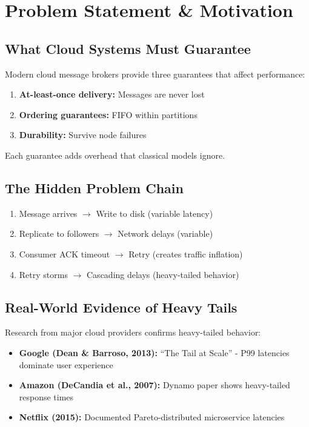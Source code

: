 \documentclass[11pt,a4paper]{article}
\begin{document}
\section{Problem Statement \& Motivation}

\subsection{What Cloud Systems Must Guarantee}

Modern cloud message brokers provide three guarantees that affect performance:

\begin{enumerate}
    \item \textbf{At-least-once delivery:} Messages are never lost
    \item \textbf{Ordering guarantees:} FIFO within partitions
    \item \textbf{Durability:} Survive node failures
\end{enumerate}

Each guarantee adds overhead that classical models ignore.

\subsection{The Hidden Problem Chain}

\begin{enumerate}
    \item Message arrives $\rightarrow$ Write to disk (variable latency)
    \item Replicate to followers $\rightarrow$ Network delays (variable)
    \item Consumer ACK timeout $\rightarrow$ Retry (creates traffic inflation)
    \item Retry storms $\rightarrow$ Cascading delays (heavy-tailed behavior)
\end{enumerate}

\subsection{Real-World Evidence of Heavy Tails}

Research from major cloud providers confirms heavy-tailed behavior:

\begin{itemize}
    \item \textbf{Google (Dean \& Barroso, 2013):} ``The Tail at Scale'' - P99 latencies dominate user experience
    \item \textbf{Amazon (DeCandia et al., 2007):} Dynamo paper shows heavy-tailed response times
    \item \textbf{Netflix (2015):} Documented Pareto-distributed microservice latencies
\end{itemize}
\end{document}
